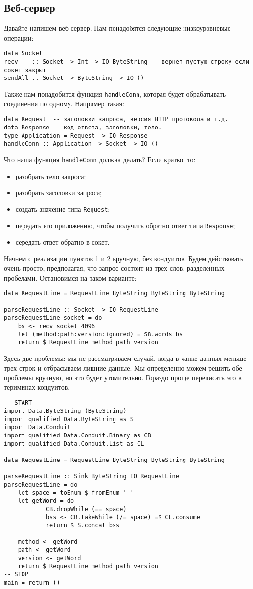 \subsection{Веб-сервер}
Давайте напишем веб-сервер. Нам понадобятся следующие низкоуровневые операции:
\begin{lstlisting}
data Socket
recv    :: Socket -> Int -> IO ByteString -- вернет пустую строку если сокет закрыт
sendAll :: Socket -> ByteString -> IO ()
\end{lstlisting}
Также нам понадобится функция \lstinline'handleConn', которая будет обрабатывать 
соединения по одному. Например такая:
\begin{lstlisting}
data Request  -- заголовки запроса, версия HTTP протокола и т.д.
data Response -- код ответа, заголовки, тело.
type Application = Request -> IO Response
handleConn :: Application -> Socket -> IO ()
\end{lstlisting}
Что наша функция \lstinline'handleConn' должна делать? Если кратко, то:
\begin{itemize}  
\item   разобрать тело запроса;
\item   разобрать заголовки запроса;
\item   создать значение типа \lstinline'Request';
\item   передать его приложению, чтобы получить обратно ответ типа \lstinline'Response';
\item   середать ответ обратно в сокет.
\end{itemize}  
Начнем с реализации пунктов 1 и 2 вручную, без кондуитов. Будем действовать очень 
просто, предполагая, что запрос состоит из трех слов, разделенных пробелами. 
Остановимся на таком варианте:
\begin{lstlisting}
data RequestLine = RequestLine ByteString ByteString ByteString

parseRequestLine :: Socket -> IO RequestLine
parseRequestLine socket = do
    bs <- recv socket 4096
    let (method:path:version:ignored) = S8.words bs
    return $ RequestLine method path version
\end{lstlisting}
Здесь две проблемы: мы не рассматриваем случай, когда в чанке данных меньше 
трех строк и отбрасываем лишние данные. Мы определенно можем решить обе 
проблемы вручную, но это будет утомительно. Гораздо проще переписать это 
в териминах кондуитов.
\begin{lstlisting}
-- START
import Data.ByteString (ByteString)
import qualified Data.ByteString as S
import Data.Conduit
import qualified Data.Conduit.Binary as CB
import qualified Data.Conduit.List as CL

data RequestLine = RequestLine ByteString ByteString ByteString

parseRequestLine :: Sink ByteString IO RequestLine
parseRequestLine = do
    let space = toEnum $ fromEnum ' '
    let getWord = do
            CB.dropWhile (== space)
            bss <- CB.takeWhile (/= space) =$ CL.consume
            return $ S.concat bss

    method <- getWord
    path <- getWord
    version <- getWord
    return $ RequestLine method path version
-- STOP
main = return ()
\end{lstlisting}
